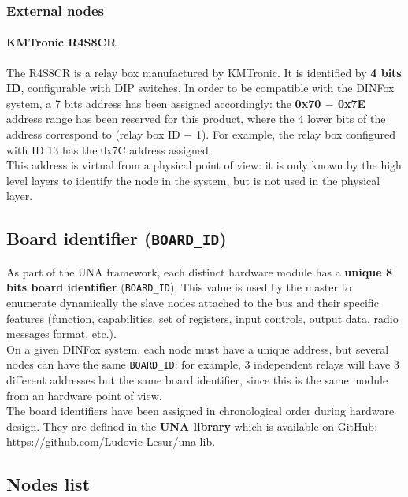 \subsubsection{External nodes}

\paragraph{KMTronic R4S8CR}

The R4S8CR is a relay box manufactured by KMTronic. It is identified by \textbf{4 bits ID}, configurable with DIP switches. In order to be compatible with the DINFox system, a 7 bits address has been assigned accordingly: the \textbf{0x70 $-$ 0x7E} address range has been reserved for this product, where the 4 lower bits of the address correspond to (relay box ID $-$ 1). For example, the relay box configured with ID 13 has the 0x7C address assigned.
\medskip \\
This address is virtual from a physical point of view: it is only known by the high level layers to identify the node in the system, but is not used in the physical layer.

\subsection{Board identifier (\texttt{BOARD\_ID})}

As part of the UNA framework, each distinct hardware module has a \textbf{unique 8 bits board identifier} (\texttt{BOARD\_ID}). This value is used by the master to enumerate dynamically the slave nodes attached to the bus and their specific features (function, capabilities, set of registers, input controls, output data, radio messages format, etc.).
\medskip \\
On a given DINFox system, each node must have a unique address, but several nodes can have the same \texttt{BOARD\_ID}: for example, 3 independent relays will have 3 different addresses but the same board identifier, since this is the same module from an hardware point of view.
\medskip \\
The board identifiers have been assigned in chronological order during hardware design. They are defined in the \textbf{UNA library} which is available on GitHub: \url{https://github.com/Ludovic-Lesur/una-lib}.

\newpage

\subsection{Nodes list}

